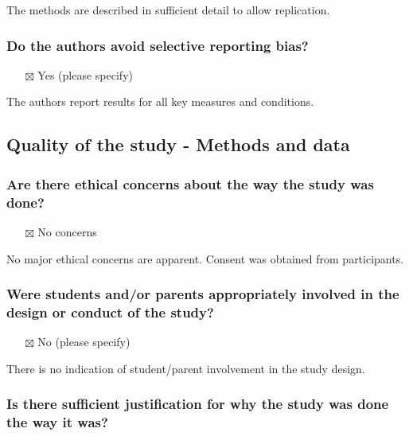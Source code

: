 \documentclass[
  doc, a4paper]{apa7}
\providecommand{\tightlist}{%
  \setlength{\itemsep}{0pt}\setlength{\parskip}{0pt}}
\begin{document}
The methods are described in sufficient detail to allow replication.

\subsubsection{Do the authors avoid selective reporting bias?}\label{do-the-authors-avoid-selective-reporting-bias}

\begin{itemize}
\tightlist
\item[$\boxtimes$]
  Yes (please specify)
\end{itemize}

The authors report results for all key measures and conditions.

\subsection{Quality of the study - Methods and data}\label{quality-of-the-study---methods-and-data}

\subsubsection{Are there ethical concerns about the way the study was done?}\label{are-there-ethical-concerns-about-the-way-the-study-was-done}

\begin{itemize}
\tightlist
\item[$\boxtimes$]
  No concerns
\end{itemize}

No major ethical concerns are apparent. Consent was obtained from participants.

\subsubsection{Were students and/or parents appropriately involved in the design or conduct of the study?}\label{were-students-andor-parents-appropriately-involved-in-the-design-or-conduct-of-the-study}

\begin{itemize}
\tightlist
\item[$\boxtimes$]
  No (please specify)
\end{itemize}

There is no indication of student/parent involvement in the study design.

\subsubsection{Is there sufficient justification for why the study was done the way it was?}\label{is-there-sufficient-justification-for-why-the-study-was-done-the-way-it-was}
\end{document}
